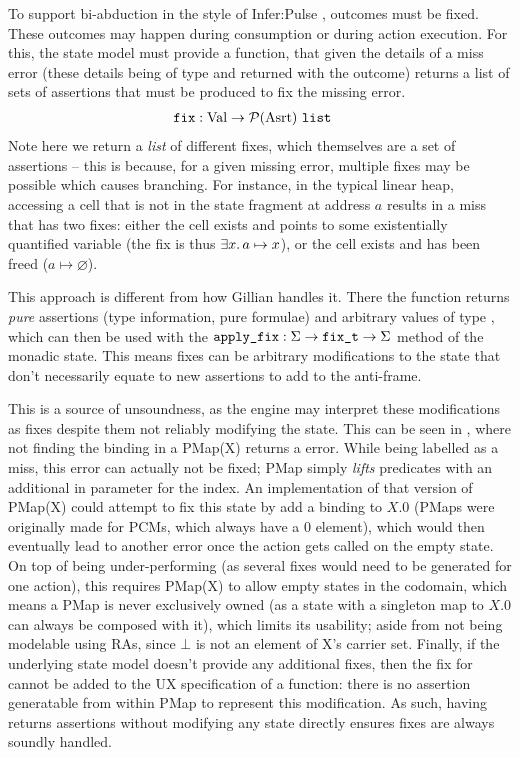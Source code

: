 To support bi-abduction in the style of Infer:Pulse \cite{pulse}, \Miss{} outcomes must be fixed. These outcomes may happen during consumption or during action execution. For this, the state model must provide a \fix{} function, that given the details of a miss error (these details being of type \Val{} and returned with the outcome) returns a list of sets of assertions that must be produced to fix the missing error.
\begin{align*}
	\texttt{fix} &: \text{Val} \rightarrow {\cal P}(\text{Asrt}) ~\texttt{list}
\end{align*}
Note here we return a \emph{list} of different fixes, which themselves are a set of assertions -- this is because, for a given missing error, multiple fixes may be possible which causes branching. For instance, in the typical linear heap, accessing a cell that is not in the state fragment at address $a$ results in a miss that has two fixes: either the cell exists and points to some existentially quantified variable (the fix is thus $\exists x\ldotp a \mapsto x$), or the cell exists and has been freed ($a\mapsto\varnothing$).

This approach is different from how Gillian handles it. There the function \fix{} returns \emph{pure} assertions (type information, pure formulae) and arbitrary values of type , which can then be used with the $\texttt{apply\_fix}:\Sigma \rightarrow \texttt{fix\_t} \rightarrow \Sigma$ method of the monadic state. This means fixes can be arbitrary modifications to the state that don't necessarily equate to new assertions to add to the anti-frame.

This is a source of unsoundness, as the engine may interpret these modifications as fixes despite them not reliably modifying the state. This can be seen in \cite{sacha-phd}, where not finding the binding in a PMap(X) returns a  error. While being labelled as a miss, this error can actually not be fixed; PMap simply \emph{lifts} predicates with an additional in parameter for the index. An implementation of that version of PMap(X) could attempt to fix this state by add a binding to $X.0$ (PMaps were originally made for PCMs, which always have a 0 element), which would then eventually lead to another error once the action gets called on the empty state. On top of being under-performing (as several fixes would need to be generated for one action), this requires PMap(X) to allow empty states in the codomain, which means a PMap is never exclusively owned (as a state with a singleton map to $X.0$ can always be composed with it), which limits its usability; aside from not being modelable using RAs, since $\bot$ is not an element of X's carrier set. Finally, if the underlying state model doesn't provide any additional fixes, then the fix for  cannot be added to the UX specification of a function: there is no assertion generatable from within PMap to represent this modification. As such, having \fix{} returns assertions without modifying any state directly ensures fixes are always soundly handled.

